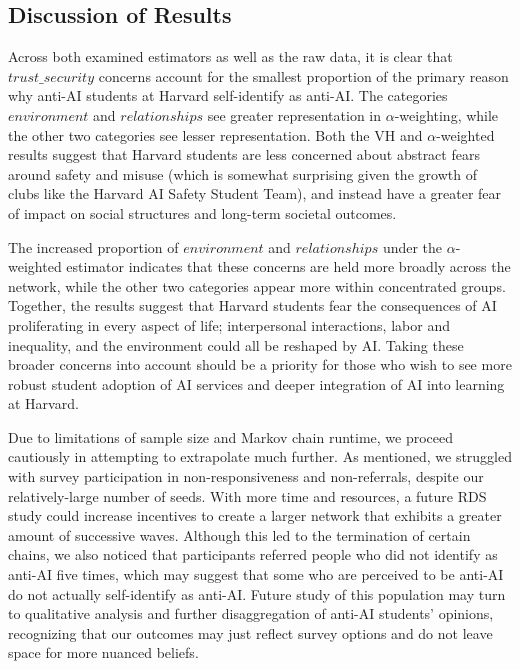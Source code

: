 \documentclass[11pt,a4paper,twocolumn,twoside]{rho-class/rho}
\begin{document}

\subsection{Discussion of Results}

Across both examined estimators as well as the raw data, it is clear that $trust\_security$ concerns account for the smallest proportion of the primary reason why anti-AI students at Harvard self-identify as anti-AI. The categories $environment$ and $relationships$ see greater representation in $\alpha$-weighting, while the other two categories see lesser representation. Both the VH and $\alpha$-weighted results suggest that Harvard students are less concerned about abstract fears around safety and misuse (which is somewhat surprising given the growth of clubs like the Harvard AI Safety Student Team), and instead have a greater fear of impact on social structures and long-term societal outcomes. 

The increased proportion of $environment$ and $relationships$ under the $\alpha$-weighted estimator indicates that these concerns are held more broadly across the network, while the other two categories appear more within concentrated groups. Together, the results suggest that Harvard students fear the consequences of AI proliferating in every aspect of life; interpersonal interactions, labor and inequality, and the environment could all be reshaped by AI. Taking these broader concerns into account should be a priority for those who wish to see more robust student adoption of AI services and deeper integration of AI into learning at Harvard.

Due to limitations of sample size and Markov chain runtime, we proceed cautiously in attempting to extrapolate much further. As mentioned, we struggled with survey participation in non-responsiveness and non-referrals, despite our relatively-large number of seeds. With more time and resources, a future RDS study could increase incentives to create a larger network that exhibits a greater amount of successive waves. Although this led to the termination of certain chains, we also noticed that participants referred people who did not identify as anti-AI five times, which may suggest that some who are perceived to be anti-AI do not actually self-identify as anti-AI. Future study of this population may turn to qualitative analysis and further disaggregation of anti-AI students' opinions, recognizing that our outcomes may just reflect survey options and do not leave space for more nuanced beliefs. 
\end{document}
